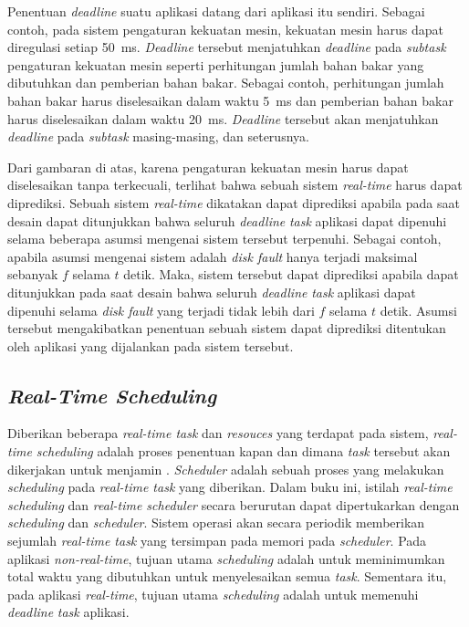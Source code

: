 Penentuan \textit{deadline} suatu aplikasi datang dari aplikasi itu sendiri.  Sebagai contoh,
pada sistem pengaturan kekuatan mesin, kekuatan mesin harus dapat diregulasi setiap
\SI{50}{\milli\second}.  \textit{Deadline} tersebut menjatuhkan \textit{deadline} pada
\textit{subtask} pengaturan kekuatan mesin seperti perhitungan jumlah bahan bakar yang
dibutuhkan dan pemberian bahan bakar.  Sebagai contoh, perhitungan jumlah bahan bakar harus
diselesaikan dalam waktu \SI{5}{\milli\second} dan pemberian bahan bakar harus diselesaikan
dalam waktu \SI{20}{\milli\second}.  \textit{Deadline} tersebut akan menjatuhkan
\textit{deadline} pada \textit{subtask} masing-masing, dan seterusnya.

Dari gambaran di atas, karena pengaturan kekuatan mesin harus dapat diselesaikan tanpa
terkecuali, terlihat bahwa sebuah sistem \textit{real-time} harus dapat diprediksi.  Sebuah
sistem \textit{real-time} dikatakan dapat diprediksi apabila pada saat desain dapat ditunjukkan
bahwa seluruh \textit{deadline} \textit{task} aplikasi dapat dipenuhi selama beberapa asumsi
mengenai sistem tersebut terpenuhi.  Sebagai contoh, apabila asumsi mengenai sistem adalah
\textit{disk fault} hanya terjadi maksimal sebanyak $f$ selama $t$ detik.  Maka, sistem tersebut
dapat diprediksi apabila dapat ditunjukkan pada saat desain bahwa seluruh \textit{deadline}
\textit{task} aplikasi dapat dipenuhi selama \textit{disk fault} yang terjadi tidak lebih dari
$f$ selama $t$ detik.  Asumsi tersebut mengakibatkan penentuan sebuah sistem dapat diprediksi
ditentukan oleh aplikasi yang dijalankan pada sistem tersebut.

\subsection{\textit{Real-Time Scheduling}}

Diberikan beberapa \textit{real-time task} dan \textit{resouces} yang terdapat pada sistem,
\textit{real-time scheduling} adalah proses penentuan kapan dan dimana \textit{task} tersebut
akan dikerjakan untuk menjamin \cite[pp.~8-9]{Shin1994}.  \textit{Scheduler} adalah sebuah
proses yang melakukan \textit{scheduling} pada \textit{real-time task} yang diberikan.  Dalam
buku ini, istilah \textit{real-time scheduling} dan \textit{real-time scheduler} secara
berurutan dapat dipertukarkan dengan \textit{scheduling} dan \textit{scheduler}.  Sistem operasi
akan secara periodik memberikan sejumlah \textit{real-time task} yang tersimpan pada memori pada
\textit{scheduler}.  Pada aplikasi \textit{non-real-time}, tujuan utama \textit{scheduling}
adalah untuk meminimumkan total waktu yang dibutuhkan untuk menyelesaikan semua \textit{task}.
Sementara itu, pada aplikasi \textit{real-time}, tujuan utama \textit{scheduling} adalah untuk
memenuhi \textit{deadline} \textit{task} aplikasi.

